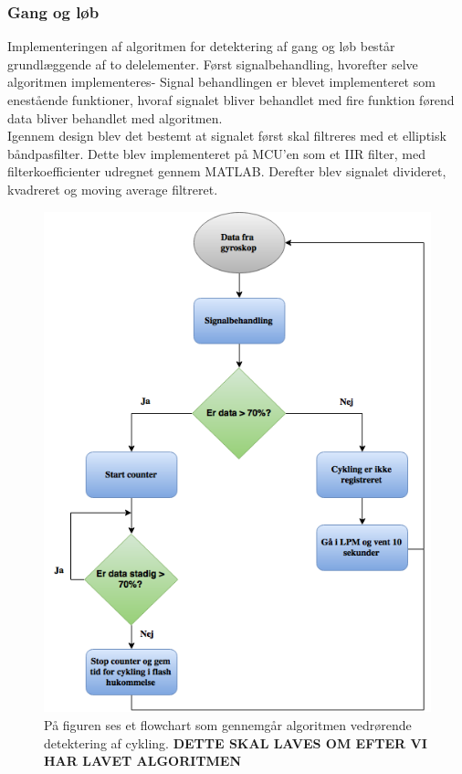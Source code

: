 \subsubsection{Gang og løb}
Implementeringen af algoritmen for detektering af gang og løb består grundlæggende af to delelementer. Først signalbehandling, hvorefter selve algoritmen implementeres- Signal behandlingen er blevet implementeret som enestående funktioner, hvoraf signalet bliver behandlet med fire funktion førend data bliver behandlet med algoritmen. \\
Igennem design blev det bestemt at signalet først skal filtreres med et elliptisk båndpasfilter. Dette blev implementeret på MCU'en som et IIR filter, med filterkoefficienter udregnet gennem MATLAB. Derefter blev signalet divideret, kvadreret og moving average filtreret. 

\begin{figure}[H]
	\centering
	\includegraphics[scale=0.6]{figures/cDesign/algoritme_cykling.png}
	\caption{På figuren ses et flowchart som gennemgår algoritmen vedrørende detektering af cykling. \textbf{DETTE SKAL LAVES OM EFTER VI HAR LAVET ALGORITMEN}}
	\label{fig:algoritme_cykling}
\end{figure}

